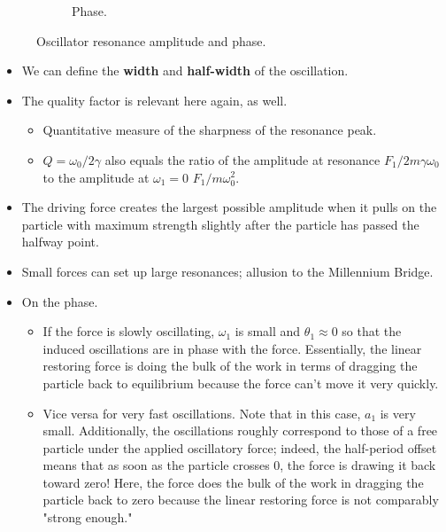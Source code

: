 \documentclass[../notes.tex]{subfiles}
\begin{document}
\begin{itemize}
\begin{figure}[h!]
\begin{subfigure}[b]{0.4\linewidth}
            \caption{Phase.}
            \label{fig:resb}
        \end{subfigure}
        \caption{Oscillator resonance amplitude and phase.}
        \label{fig:res}
    \end{figure}
    \begin{itemize}
        \item We can define the \textbf{width} and \textbf{half-width} of the oscillation.
        \item The quality factor is relevant here again, as well.
        \begin{itemize}
            \item Quantitative measure of the sharpness of the resonance peak.
            \item $Q=\omega_0/2\gamma$ also equals the ratio of the amplitude at resonance $F_1/2m\gamma\omega_0$ to the amplitude at $\omega_1=0$ $F_1/m\omega_0^2$.
        \end{itemize}
        \item The driving force creates the largest possible amplitude when it pulls on the particle with maximum strength slightly after the particle has passed the halfway point.
        \item Small forces can set up large resonances; allusion to the Millennium Bridge.
        \item On the phase.
        \begin{itemize}
            \item If the force is slowly oscillating, $\omega_1$ is small and $\theta_1\approx 0$ so that the induced oscillations are in phase with the force. Essentially, the linear restoring force is doing the bulk of the work in terms of dragging the particle back to equilibrium because the force can't move it very quickly.
            \item Vice versa for very fast oscillations. Note that in this case, $a_1$ is very small. Additionally, the oscillations roughly correspond to those of a free particle under the applied oscillatory force; indeed, the half-period offset means that as soon as the particle crosses 0, the force is drawing it back toward zero! Here, the force does the bulk of the work in dragging the particle back to zero because the linear restoring force is not comparably "strong enough."

\end{itemize}
\end{itemize}
\end{itemize}
\end{document}
